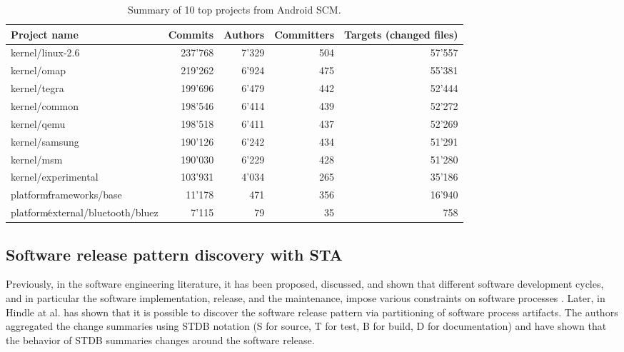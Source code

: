 \begin{table}[t]
\caption{Summary of 10 top projects from Android SCM.}
\label{android_table1}
\centering
\begin{tabularx}{\linewidth}{l r r r r}
\hline
Project name & Commits  & Authors  & Committers  & Targets (changed files) \\
\hline
\raggedright
kernel/linux-2.6 &   237'768  & 7'329 &    504    &     57'557    \\
kernel/omap &       219'262  & 6'924 &    475    &     55'381    \\
kernel/tegra &        199'696 &  6'479 &    442      &   52'444    \\
kernel/common &   198'546  & 6'414  &   439   &      52'272    \\
kernel/qemu  &       198'518  & 6'411  &  437     &    52'269    \\
kernel/samsung &   190'126 &  6'242  &   434    &     51'291    \\
kernel/msm  &        190'030 &  6'229  &   428      &   51'280    \\
kernel/experimental           &     103'931  & 4'034   &  265    &     35'186    \\
platform∕frameworks/base   &        11'178  &  471  &    356   &      16'940   \\ 
platform∕external/bluetooth/bluez & 7'115   &  79    &   35     &     758  \\
\hline
\end{tabularx}
\end{table}

\subsection{Software release pattern discovery with STA}
Previously, in the software engineering literature, it has been proposed, discussed, and shown that different software 
development cycles, and in particular the software implementation, release, and the maintenance, impose various constraints 
on software processes \cite{citeulike:1802027} \cite{citeulike:13374124} \cite{citeulike:13374128} \cite{citeulike:6086365}.
Later, in \cite{citeulike:10377366} Hindle at al. has shown that it is possible to discover the software release pattern
via partitioning of software process artifacts. The authors aggregated the change summaries using STDB notation 
(S for source, T for test, B for build, D for documentation) and have shown that the behavior of STDB summaries changes
around the software release.

